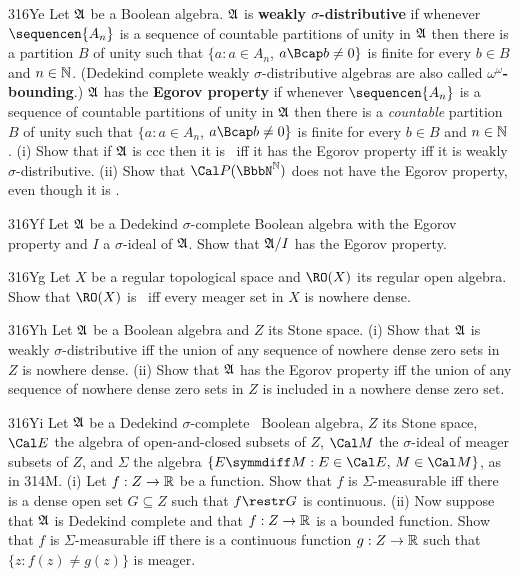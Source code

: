 {\spheader 316Ye
Let $\frak A$ be a Boolean algebra.   $\frak A$ is
{\bf weakly $\sigma$-distributive} if whenever
$\sequencen{A_n}$ is a sequence of countable partitions of unity in
$\frak A$ then there is a partition $B$ of unity such that
$\{a:a\in A_n$, $a\Bcap b\ne 0\}$ is finite for every $b\in B$ and
$n\in\Bbb N$.   (Dedekind complete weakly $\sigma$-distributive algebras
are also called {\bf $\omega^{\omega}$-bounding}.)   $\frak A$ has the
{\bf Egorov property} if whenever
$\sequencen{A_n}$ is a sequence of countable partitions of unity in
$\frak A$ then there is a {\it countable} partition $B$ of unity such that
$\{a:a\in A_n$, $a\Bcap b\ne 0\}$ is finite for every $b\in B$ and
$n\in\Bbb N$.   (i) Show that if $\frak A$ is ccc
then it is \wsid\ iff it has the Egorov property iff it is weakly
$\sigma$-distributive.   (ii) Show that $\Cal P(\BbbN^{\Bbb N})$ does
not have the Egorov property, even though it is \wsid.   

\spheader 316Yf Let $\frak A$ be a Dedekind $\sigma$-complete
Boolean algebra with the Egorov property
and $I$ a $\sigma$-ideal of $\frak A$.   Show that $\frak A/I$ has the
Egorov property.

\spheader 316Yg
Let $X$ be a regular topological space and $\RO(X)$ its
regular open algebra.   Show that $\RO(X)$ is \wsid\ iff every meager
set in $X$ is nowhere dense.

\spheader 316Yh
Let $\frak A$ be a Boolean algebra and $Z$ its Stone
space.   (i) Show that $\frak A$ is weakly $\sigma$-distributive iff the
union of any sequence of nowhere dense zero sets in $Z$ is nowhere
dense.
(ii) Show that $\frak A$ has the Egorov property iff the union of any
sequence of nowhere dense zero sets in $Z$ is included in a nowhere
dense zero set.

\spheader 316Yi Let $\frak A$ be a Dedekind $\sigma$-complete \wsid\
Boolean algebra, $Z$ its Stone space, $\Cal E$ the algebra of
open-and-closed subsets of $Z$, $\Cal M$ the $\sigma$-ideal of meager
subsets of $Z$, and $\Sigma$ the algebra
$\{E\symmdiff M:E\in\Cal E,\,M\in\Cal M\}$, as in 314M.   (i) Let
$f:Z\to\Bbb R$ be a function.   Show that $f$ is
$\Sigma$-measurable iff there is a dense open set
$G\subseteq Z$ such that $f\restr G$ is continuous.   (ii) Now suppose
that $\frak A$ is Dedekind complete and that $f:Z\to\Bbb R$ is a
bounded function.   Show that $f$ is $\Sigma$-measurable iff there is
a continuous function $g:Z\to\Bbb R$ such that $\{z:f(z)\ne g(z)\}$
is meager.   

}
